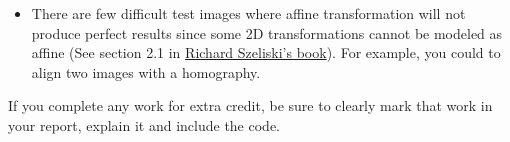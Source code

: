 \documentclass[10pt,letterpaper]{article}
\begin{document}
\begin{itemize}
\item There are few difficult test images where affine transformation will not produce perfect results since some 2D transformations cannot be modeled as affine (See section 2.1 in \href{http://szeliski.org/Book/drafts/SzeliskiBook_20100903_draft.pdf}{Richard Szeliski's book}). For example, you could to align two images with a homography.
\end{itemize}
If you complete any work for extra credit, be sure to clearly mark that work in your report, explain it and include the code.
\end{document}
